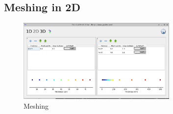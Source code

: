 \subsection{Meshing in 2D}

\begin{figure}[H]
\centering
\includegraphics[width=0.7\textwidth]{./images/ofet_4.png}
\caption{Meshing}
\label{fig:ofetmeshing}
\end{figure}









